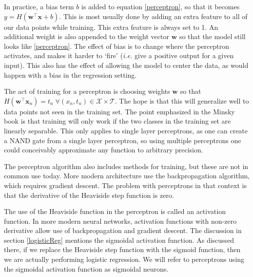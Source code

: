 In practice, a bias term \( b \) is added to equation \ref{perceptron}, so that it becomes \( y = H(\bm w^{\intercal} \bm x +b) \). This is most usually done by adding an extra feature to all of our data points while training. This extra feature is always set to 1.  An additional weight is also appended to the weight vector \( \bm w \) so that the model still looks like \ref{perceptron}. The effect of bias is to change where the perceptron activates, and makes it harder to `fire' (\textit{i.e.} give a positive output for a given input). This also has the effect of allowing the model to center the data, as would happen with a bias in the regression setting.

The act of training for a perceptron is choosing weights \( \bm w \) so that \( H(\bm w^{\intercal} \bm x_n) = t_n\;\forall (x_n,t_n)\in \mathcal{X}\times \mathcal{T} \). The hope is that this will generalize well to data points not seen in the training set.  The point emphasized in the Minsky book \cite{Minsky90Perceptron} is that training will only work if the two classes in the training set are linearly separable.  This only applies to single layer perceptrons, as one can create a NAND gate from a single layer perceptron, so using multiple perceptrons one could conceivably approximate any function to arbitrary precision.

The perceptron algorithm also includes methods for training, but these are not in common use today.  More modern architecture use the backpropagation algorithm, which requires gradient descent.  The problem with perceptrons in that context is that the derivative of the Heaviside step function is zero. 

The use of the Heaviside function in the perceptron is called an activation function.  In more modern neural networks, activation functions with non-zero derivative allow use of backpropagation and gradient descent.  The discussion in section \ref{logisticReg} mentions the sigmoidal activation function.  As discussed there, if we replace the Heaviside step function with the sigmoid function, then we are actually performing logistic regression.  We will refer to perceptrons using the sigmoidal activation function as sigmoidal neurons.

